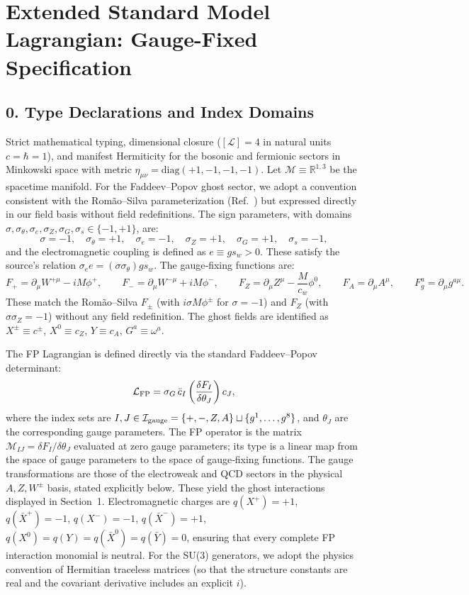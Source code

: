 \documentclass{article}
\begin{document}
\section*{Extended Standard Model Lagrangian: Gauge-Fixed Specification}

\subsection*{0. Type Declarations and Index Domains}
Strict mathematical typing, dimensional closure ($[\mathcal{L}] = 4$ in natural units $c = \hbar = 1$), and manifest Hermiticity for the bosonic and fermionic sectors in Minkowski space with metric $\eta_{\mu\nu} = \mathrm{diag}(+1, -1, -1, -1)$. Let $\mathcal M \equiv \mathbb{R}^{1,3}$ be the spacetime manifold. For the Faddeev–Popov ghost sector, we adopt a convention consistent with the Romão–Silva parameterization (Ref.~\cite{arXiv:1209.6213}) but expressed directly in our field basis without field redefinitions. The sign parameters, with domains $\sigma,\sigma_\theta,\sigma_e,\sigma_Z,\sigma_G,\sigma_s \in \{-1,+1\}$, are:
\[
\sigma = -1,\quad \sigma_\theta = +1,\quad \sigma_e = -1,\quad 
\sigma_Z = +1,\quad \sigma_G = +1,\quad \sigma_s = -1,
\]
and the electromagnetic coupling is defined as $e \equiv g s_w > 0$. These satisfy the source's relation $\sigma_e e = (\sigma \sigma_\theta) g s_w$. The gauge‑fixing functions are:
\[
F_+ = \partial_\mu W^{+\mu} - i M \phi^+,\qquad
F_- = \partial_\mu W^{-\mu} + i M \phi^-,\qquad
F_Z = \partial_\mu Z^\mu - \frac{M}{c_w}\phi^0,\qquad
F_A = \partial_\mu A^\mu,\qquad
F_g^a = \partial_\mu g^{a\mu}.
\]
These match the Romão–Silva $F_\pm$ (with $i\sigma M\phi^\pm$ for $\sigma=-1$) and $F_Z$ (with $\sigma\sigma_Z = -1$) without any field redefinition. The ghost fields are identified as $X^\pm \equiv c^\pm$, $X^0 \equiv c_Z$, $Y \equiv c_A$, $G^a \equiv \omega^a$.

The FP Lagrangian is defined directly via the standard Faddeev–Popov determinant:
\[
\mathcal L_{\rm FP} = \sigma_G \,\bar c_I \left(\frac{\delta F_I}{\delta \theta_J}\right) c_J,
\]
where the index sets are $I,J \in \mathcal I_{\rm gauge} = \{+, -, Z, A\} \sqcup \{g^1,\dots,g^8\}$, and $\theta_J$ are the corresponding gauge parameters. The FP operator is the matrix $\mathcal M_{IJ} = \delta F_I/\delta \theta_J$ evaluated at zero gauge parameters; its type is a linear map from the space of gauge parameters to the space of gauge‑fixing functions. The gauge transformations are those of the electroweak and QCD sectors in the physical $A,Z,W^\pm$ basis, stated explicitly below. These yield the ghost interactions displayed in Section~1. Electromagnetic charges are $q(X^+)=+1$, $q(\bar{X}^+)=-1$, $q(X^-)=-1$, $q(\bar{X}^-)=+1$, $q(X^0)=q(Y)=q(\bar{X}^0)=q(\bar{Y})=0$, ensuring that every complete FP interaction monomial is neutral. For the SU(3) generators, we adopt the physics convention of Hermitian traceless matrices (so that the structure constants are real and the covariant derivative includes an explicit $i$).
\end{document}
